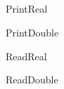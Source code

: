 \subsection{}

\begin{procdesc}{PrintReal}{}
\end{procdesc}

\begin{procdesc}{PrintDouble}{}
\end{procdesc}

\begin{procdesc}{ReadReal}{}
\end{procdesc}

\begin{procdesc}{ReadDouble}{}
\end{procdesc}
